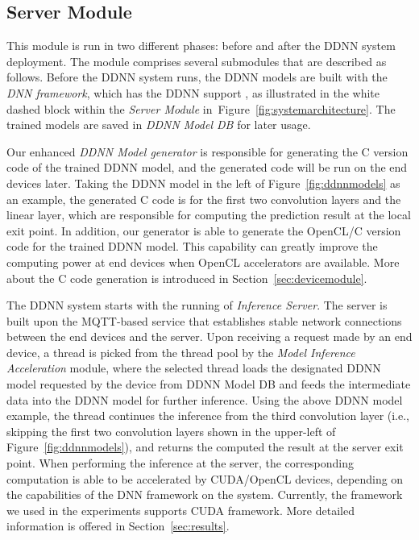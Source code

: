 \documentclass[conference]{IEEEtran}
\def\figurename{Figure}
\def\sectionname{Section}
\begin{document}
\subsection{Server Module}
\label{sec:servermodule}
This module is run in two different phases: before and after the DDNN system deployment. The module comprises several submodules that are described as follows. Before the DDNN system runs, the DDNN models are built with the \emph{DNN framework}, which has the DDNN support \cite{Teerapittayanon17}, as illustrated in the white dashed block within the \emph{Server Module} in~\figurename~\ref{fig:systemarchitecture}. The trained models are saved in \emph{DDNN Model DB} for later usage.

Our enhanced \emph{DDNN Model generator} is responsible for generating the C version code of the trained DDNN model, and the generated code will be run on the end devices later. Taking the DDNN model in the left of \figurename~\ref{fig:ddnnmodels} as an example, the generated C code is for the first two convolution layers and the linear layer, which are responsible for computing the prediction result at the local exit point. In addition, our generator is able to generate the OpenCL/C version code for the trained DDNN model. This capability can greatly improve the computing power at end devices when OpenCL accelerators are available. More about the C code generation is introduced in \sectionname~\ref{sec:devicemodule}.

The DDNN system starts with the running of \emph{Inference Server}. The server is built upon the MQTT-based service \cite{aziz2014formal} that establishes stable network connections between the end devices and the server. Upon receiving a request made by an end device, a thread is picked from the thread pool by the \emph{Model Inference Acceleration} module, where the selected thread loads the designated DDNN model requested by the device from DDNN Model DB and feeds the intermediate data into the DDNN model for further inference. Using the above DDNN model example, the thread continues the inference from the third convolution layer (i.e., skipping the first two convolution layers shown in the upper-left of \figurename~\ref{fig:ddnnmodels}), and returns the computed the result at the server exit point. When performing the inference at the server, the corresponding computation is able to be accelerated by CUDA/OpenCL devices, depending on the capabilities of the DNN framework on the system. Currently, the framework we used in the experiments supports CUDA framework. More detailed information is offered in \sectionname~\ref{sec:results}.
\end{document}
